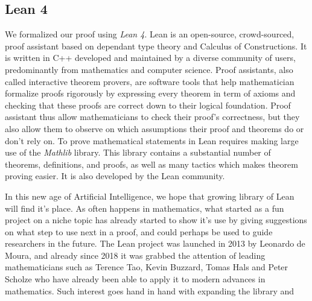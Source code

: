 \documentclass[../main.tex]{subfiles}
\begin{document}
\subsection{Lean 4}


We formalized our proof using \textit{Lean 4}. 
Lean is an open-source, crowd-sourced, proof assistant %
based on dependant type theory and Calculus of Constructions. It is written in C++ developed and maintained by a diverse community of users, predominantly from mathematics and computer science.
Proof assistants, also called interactive theorem provers, are software tools that help mathematician formalize proofs rigorously by expressing every theorem in term of axioms and checking that these proofs are correct down to their logical foundation.  Proof assistant thus allow mathematicians to check their proof's correctness, but they also allow them to observe on which assumptions their proof and theorems do or don't rely on. 
To prove mathematical statements in Lean requires making large use of the \textit{Mathlib} library. 
This library contains a substantial number of theorems, definitions, and proofs, as well as many tactics which makes theorem proving easier. 
It is also developed by the Lean community.

In this new age of Artificial Intelligence, we hope that growing library of Lean will find it's place.
As often happens in mathematics, what started as a fun project on a niche topic has already started to show it's use by giving suggestions on what step to use next in a proof, and could perhaps be used to guide researchers in the future. The Lean project was launched in 2013 by Leonardo de Moura, and already since 2018 it was grabbed the attention of leading mathematicians such as Terence Tao, Kevin Buzzard, Tomas Hals and Peter Scholze who have already been able to apply it to modern advances in mathematics. Such interest goes hand in hand with expanding the library and
\end{document}
